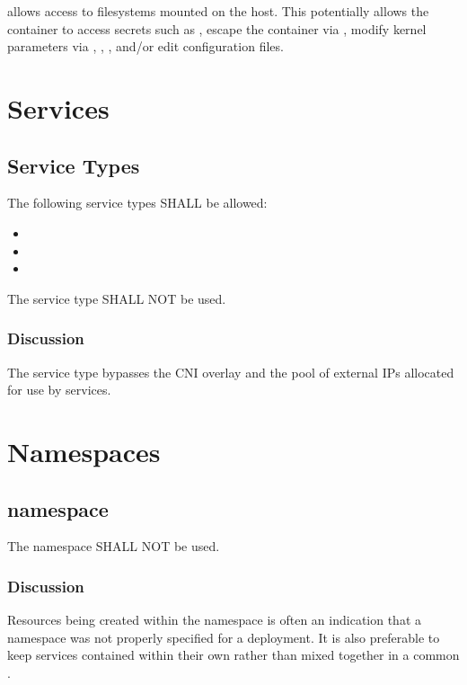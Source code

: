\documentclass[PMO,authoryear,toc]{lsstdoc}
\begin{document}
 allows access to filesystems mounted on the host. This potentially allows the container to access secrets such as , escape the container via , modify kernel parameters via , , , and/or edit configuration files.

\section{Services}\label{sec:svc}

\subsection{Service Types}

The following service types SHALL be allowed:

\begin{itemize}
  \item {}
  \item {}
  \item {}
\end{itemize}

The  service type SHALL NOT be used.

\subsubsection{Discussion}

The  service type bypasses the CNI overlay and the pool of external IPs allocated for use by  services.

\section{Namespaces}\label{sec:ns}

\subsection{ namespace}

The  namespace SHALL NOT be used.

\subsubsection{Discussion}

Resources being created within the  namespace is often an indication that a namespace was not properly specified for a deployment. It is also preferable to keep services contained within their own  rather than mixed together in a common .
\end{document}
